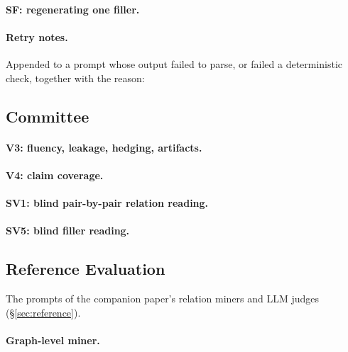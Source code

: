 \paragraph{SF: regenerating one filler.}

\paragraph{Retry notes.} Appended to a prompt whose output failed to parse, or failed a
deterministic check, together with the reason:

\subsection{Committee}

\paragraph{V3: fluency, leakage, hedging, artifacts.}

\paragraph{V4: claim coverage.}

\paragraph{SV1: blind pair-by-pair relation reading.}

\paragraph{SV5: blind filler reading.}

\subsection{Reference Evaluation}

The prompts of the companion paper's relation miners and LLM judges (\S\ref{sec:reference}).

\paragraph{Graph-level miner.}

